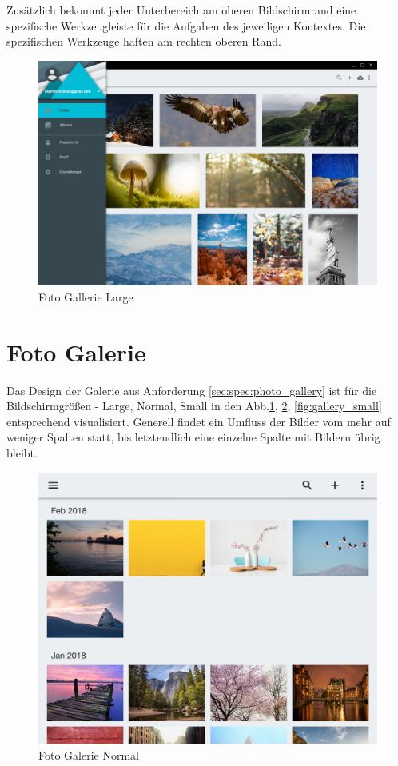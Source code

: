 Zusätzlich bekommt jeder Unterbereich am oberen Bildschirmrand eine spezifische Werkzeugleiste für die Aufgaben des jeweiligen Kontextes. Die spezifischen Werkzeuge haften am rechten oberen Rand.

\begin{figure}[htp]     %
\centering
\includegraphics[width=1.0\textwidth]{images/gallery_large} 
\caption{Foto Gallerie Large}\label{fig:gallery_large}
\end{figure}

\section{Foto Galerie}

Das Design der Galerie aus Anforderung \ref{sec:spec:photo_gallery} ist für die Bildschirmgrößen - Large, Normal, Small in den Abb.\ref{fig:gallery_large}, \ref{fig:gallery_normal}, \ref{fig:gallery_small} entsprechend visualisiert. Generell findet ein Umfluss der Bilder vom mehr auf weniger Spalten statt, bis letztendlich eine einzelne Spalte mit Bildern übrig bleibt.

\begin{figure}[htp]     %
\centering
\includegraphics[width=1.0\textwidth]{images/gallery_normal} 
\caption{Foto Galerie Normal}\label{fig:gallery_normal}
\end{figure}

